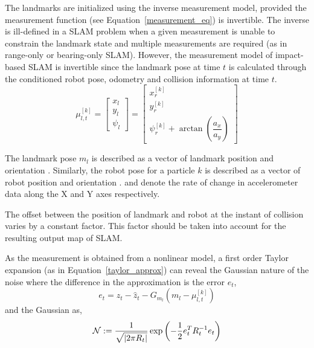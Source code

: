 The landmarks are initialized using the inverse measurement model, provided the measurement function (see Equation~\ref{measurement_eq}) is invertible. The inverse is ill-defined in a SLAM problem when a given measurement is unable to constrain the landmark state and multiple measurements are required (as in range-only or bearing-only SLAM). However, the measurement model of impact-based SLAM is invertible since the landmark pose at time $t$ is calculated through the conditioned robot pose, odometry and collision information at time $t$.
\begin{equation}
\mu^{[k]}_{l,t}=\begin{bmatrix}x_l \\ y_l \\ \psi_l
\end{bmatrix} = \begin{bmatrix}x^{[k]}_r \\ y^{[k]}_r \\ \psi^{[k]}_r+\arctan\left(\dfrac{a_x}{a_y}\right)\end{bmatrix}
\label{inv_measurement}
\end{equation}

The landmark pose $m_l$ is described as a vector of landmark position  and orientation . Similarly, the robot pose for a particle $k$ is described as a vector of robot position  and orientation .  and  denote the rate of change in accelerometer data along the X and Y axes respectively.
\begin{rem}
The offset between the position of landmark and robot at the instant of collision varies by a constant factor. This factor should be taken into account for the resulting output map of SLAM. 
\end{rem}

As the measurement is obtained from a nonlinear model, a first order Taylor expansion (as in Equation~\ref{taylor_approx}) can reveal the Gaussian nature of the noise where the difference in the approximation is the error $e_t$,
\begin{equation}
e_t=z_t-\hat{z}_t-G_{m_l}(m_l-\mu^{[k]}_{l,t})
\end{equation}
and the Gaussian as,
\begin{equation}
\mathcal{N}:= \dfrac{\displaystyle 1}{\displaystyle \sqrt{\mathstrut|2\pi R_t|}}\exp\left(-\frac{1}{2}e_t^TR_t^{-1}e_t\right)
\label{exp_gaussian}
\end{equation}

